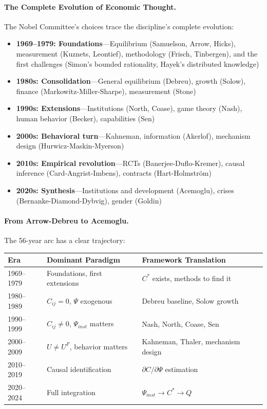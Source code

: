 \documentclass[12pt,a4paper]{article}
\begin{document}
\paragraph{The Complete Evolution of Economic Thought.}
The Nobel Committee's choices trace the discipline's complete evolution:
\begin{itemize}
  \item \textbf{1969--1979: Foundations}---Equilibrium (Samuelson, Arrow, Hicks), 
        measurement (Kuznets, Leontief), methodology (Frisch, Tinbergen),
        and the first challenges (Simon's bounded rationality, Hayek's distributed knowledge)
  \item \textbf{1980s: Consolidation}---General equilibrium (Debreu), growth (Solow), 
        finance (Markowitz-Miller-Sharpe), measurement (Stone)
  \item \textbf{1990s: Extensions}---Institutions (North, Coase), game theory (Nash),
        human behavior (Becker), capabilities (Sen)
  \item \textbf{2000s: Behavioral turn}---Kahneman, information (Akerlof),
        mechanism design (Hurwicz-Maskin-Myerson)
  \item \textbf{2010s: Empirical revolution}---RCTs (Banerjee-Duflo-Kremer),
        causal inference (Card-Angrist-Imbens), contracts (Hart-Holmström)
  \item \textbf{2020s: Synthesis}---Institutions and development (Acemoglu),
        crises (Bernanke-Diamond-Dybvig), gender (Goldin)
\end{itemize}

\paragraph{From Arrow-Debreu to Acemoglu.}
The 56-year arc has a clear trajectory:
\begin{center}
\renewcommand{\arraystretch}{1.2}
\begin{tabular}{lll}
\hline
\textbf{Era} & \textbf{Dominant Paradigm} & \textbf{Framework Translation} \\
\hline
1969--1979 & Foundations, first extensions & $C^*$ exists, methods to find it \\
1980--1989 & $C_{ij} = 0$, $\Psi$ exogenous & Debreu baseline, Solow growth \\
1990--1999 & $C_{ij} \neq 0$, $\Psi_{inst}$ matters & Nash, North, Coase, Sen \\
2000--2009 & $U \neq U^F$, behavior matters & Kahneman, Thaler, mechanism design \\
2010--2019 & Causal identification & $\partial C / \partial \Psi$ estimation \\
2020--2024 & Full integration & $\Psi_{inst} \to C^* \to Q$ \\
\hline
\end{tabular}
\end{center}
\end{document}
